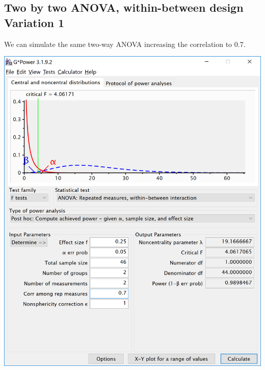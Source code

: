 \documentclass[]{book}
\begin{document}
\hypertarget{two-by-two-anova-within-between-design-variation-1}{%
\subsection{Two by two ANOVA, within-between design Variation 1}\label{two-by-two-anova-within-between-design-variation-1}}

We can simulate the same two-way ANOVA increasing the correlation to 0.7.

\includegraphics{screenshots/gpower_6.png}
\end{document}
